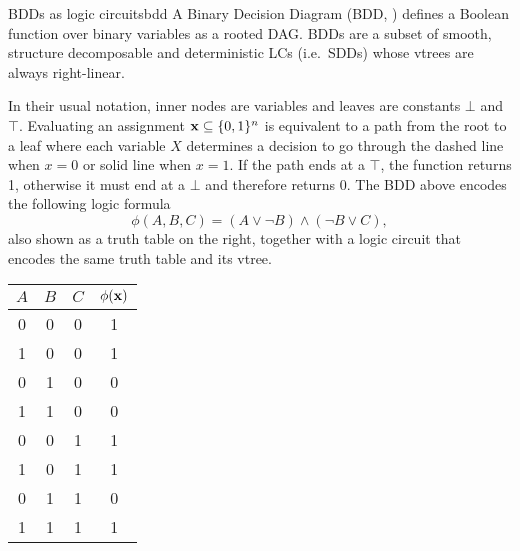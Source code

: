 \begin{example}[sidebyside,lefthand width=0.55\textwidth]{BDDs as logic circuits}{bdd}
  A Binary Decision Diagram (BDD, \cite{bryant86}) defines a Boolean function over binary variables
  as a rooted DAG. BDDs are a subset of smooth, structure decomposable and deterministic LCs (i.e.\
  SDDs) whose vtrees are always right-linear.
  \begin{center}
  \end{center}
  In their usual notation, inner nodes are variables and leaves are constants $\bot$ and $\top$.
  Evaluating an assignment $\mathbf{x}\subseteq\{0,1\}^n$ is equivalent to a path from the root to a
  leaf where each variable $X$ determines a decision to go through the dashed line when $x=0$ or
  solid line when $x=1$. If the path ends at a $\top$, the function returns 1, otherwise it must
  end at a $\bot$ and therefore returns 0. The BDD above encodes the following logic formula
  \begin{equation*}
    \phi(A,B,C)=(A\vee\neg B)\wedge(\neg B\vee C),
  \end{equation*}
  also shown as a truth table on the right, together with a logic circuit that encodes the same
  truth table and its vtree.
  \tcblower
  \small%
  \begin{center}
    \begin{tabular}{ccc|c}
      \hline
      $A$ & $B$ & $C$ & $\phi(\mathbf{x})$\\
      \hline
      0 & 0 & 0 & 1\\
      1 & 0 & 0 & 1\\
      0 & 1 & 0 & 0\\
      1 & 1 & 0 & 0\\
      0 & 0 & 1 & 1\\
      1 & 0 & 1 & 1\\
      0 & 1 & 1 & 0\\
      1 & 1 & 1 & 1\\
      \hline
    \end{tabular}


\end{center}
\end{example}
